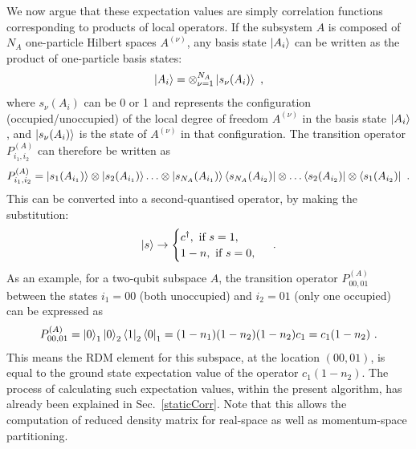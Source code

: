 \documentclass[reprint,hidelinks,onecolumn]{revtex4-2}
\begin{document}
We now argue that these expectation values are simply correlation functions corresponding to products of local operators. If the subsystem \(A\) is composed of \(N_A\) one-particle Hilbert spaces \(A^{(\nu)}\), any basis state \(\ket{A_{i}}\) can be written as the product of one-particle basis states: 
\begin{equation}\begin{aligned}
	\ket{A_i} = \otimes_{\nu=1}^{N_A}\ket{s_\nu(A_i)}~,
\end{aligned}\end{equation}
where \(s_\nu(A_i)\) can be 0 or 1 and represents the configuration (occupied/unoccupied) of the local degree of freedom \(A^{(\nu)}\) in the basis state \(\ket{A_i}\), and \(\ket{s_\nu(A_i)}\) is the state of \(A^{(\nu)}\) in that configuration. The transition operator \(P^{(A)}_{i_1,i_2}\) can therefore be written as 
\begin{equation}\begin{aligned}
	P^{(A)}_{i_1,i_2} = \ket{s_1(A_{i_1})}\otimes\ket{s_2(A_{i_1})} \ldots\otimes\ket{s_{N_A}(A_{i_1})}\bra{s_{N_A}(A_{i_2})}\otimes\ldots\bra{s_2(A_{i_2})}\otimes\bra{s_1(A_{i_2})}~.
\end{aligned}\end{equation}
This can be converted into a second-quantised operator, by making the substitution:
\begin{equation}\begin{aligned}
	\ket{s} \to 
	\begin{cases}
		c^\dagger,~\text{if }s=1,\\
		1-n,~\text{if }s=0,	
	\end{cases}~.
\end{aligned}\end{equation}
As an example, for a two-qubit subspace \(A\), the transition operator \(P^{(A)}_{00,01}\) between the states \(i_1=00\) (both unoccupied) and \(i_2=01\) (only one occupied) can be expressed as
\begin{equation}\begin{aligned}
	P^{(A)}_{00,01} = \ket{0}_1\ket{0}_2\bra{1}_2\bra{0}_1 = (1-n_1)(1-n_2)(1-n_2)c_1 = c_1(1-n_2)~.
\end{aligned}\end{equation}
This means the RDM element for this subspace, at the location \((00, 01)\), is equal to the ground state expectation value of the operator \(c_1(1-n_2)\). The process of calculating such expectation values, within the present algorithm, has already been explained in Sec.~\ref{staticCorr}. Note that this allows the computation of reduced density matrix for real-space as well as momentum-space partitioning.
\end{document}
